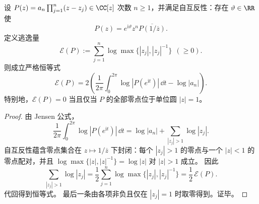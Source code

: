 \begin{proposition}\label{prop:xi-selfreciprocal-escape-jensen}
设 \(P(z)=a_n\prod_{j=1}^{n}(z-z_j)\in\CC[z]\) 次数 \(n\ge 1\)，并满足自互反性：存在 \(\vartheta\in\RR\) 使
\[
P(z)=e^{\mathrm{i}\vartheta}z^{n}\overline{P(1/\overline z)}.
\]
定义逃逸量
\[
\mathcal{E}(P):=\sum_{j=1}^{n}\log\max\{|z_j|,|z_j|^{-1}\}\ \ (\ge 0).
\]
则成立严格恒等式
\[
\boxed{\;
\mathcal{E}(P)
=2\left(\frac{1}{2\pi}\int_{0}^{2\pi}\log|P(e^{\mathrm{i}t})|\,\dd t-\log|a_n|\right). \;}
\]
特别地，\(\mathcal{E}(P)=0\) 当且仅当 \(P\) 的全部零点位于单位圆 \(|z|=1\)。
\end{proposition}
\begin{proof}
由 Jensen 公式，
\[
\frac{1}{2\pi}\int_{0}^{2\pi}\log|P(e^{\mathrm{i}t})|\,\dd t
=\log|a_n|+\sum_{|z_j|>1}\log|z_j|.
\]
自互反性蕴含零点集合在 \(z\mapsto 1/\overline z\) 下封闭：每个 \(|z_j|>1\) 的零点与一个 \(|z|<1\) 的零点配对，并且
\(
\log\max\{|z|,|z|^{-1}\}
=\log|z|
\)
对 \(|z|>1\) 成立。
因此
\[
\sum_{|z_j|>1}\log|z_j|=\frac12\sum_{j=1}^{n}\log\max\{|z_j|,|z_j|^{-1}\}=\frac12\,\mathcal{E}(P).
\]
代回得到恒等式。
最后一条由各项非负且仅在 \(|z_j|=1\) 时取零得到。证毕。
\end{proof}

